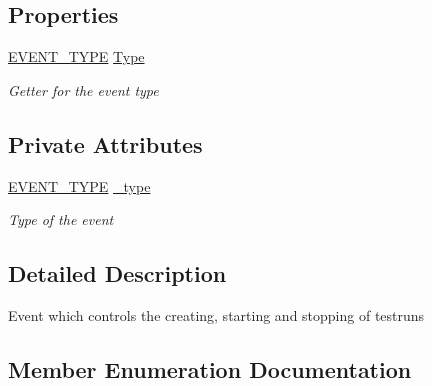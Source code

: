 \subsection*{Properties}
\begin{DoxyCompactItemize}
\item 
\hyperlink{class_web_analyzer_1_1_events_1_1_testrun_event_a97dd88675eb3148f11919cc7e40d1850}{E\+V\+E\+N\+T\+\_\+\+T\+Y\+P\+E} \hyperlink{class_web_analyzer_1_1_events_1_1_testrun_event_a2b00817b90c600d38c12f6dc1e1ebc3c}{Type}
\begin{DoxyCompactList}\small\item\em Getter for the event type \end{DoxyCompactList}\end{DoxyCompactItemize}
\subsection*{Private Attributes}
\begin{DoxyCompactItemize}
\item 
\hyperlink{class_web_analyzer_1_1_events_1_1_testrun_event_a97dd88675eb3148f11919cc7e40d1850}{E\+V\+E\+N\+T\+\_\+\+T\+Y\+P\+E} \hyperlink{class_web_analyzer_1_1_events_1_1_testrun_event_af73ff30ca9c4d62fd7367af9005fce2e}{\+\_\+type}
\begin{DoxyCompactList}\small\item\em Type of the event \end{DoxyCompactList}\end{DoxyCompactItemize}


\subsection{Detailed Description}
Event which controls the creating, starting and stopping of testruns 



\subsection{Member Enumeration Documentation}
\hypertarget{class_web_analyzer_1_1_events_1_1_testrun_event_a97dd88675eb3148f11919cc7e40d1850}{}
